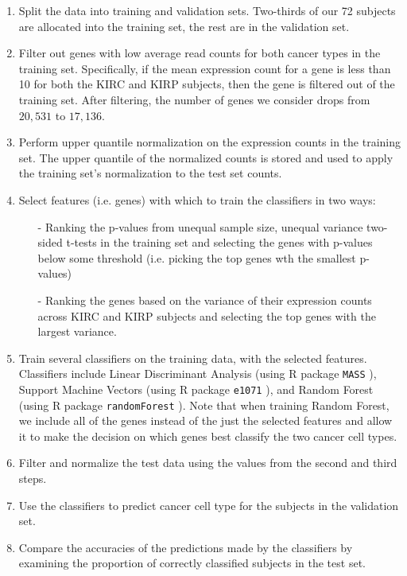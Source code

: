 \begin{enumerate}
\item Split the data into training and validation sets. Two-thirds of our 72 subjects are allocated into the training set,
the rest are in the validation set.
\item Filter out genes with low average read counts for both cancer types in the training set. Specifically, if the 
mean expression count for a gene is less than 10 for both the KIRC and KIRP subjects, then the gene is filtered out of the training
set. After filtering, the number of genes we consider drops from $20,531$ to $17,136$.
\item Perform upper quantile normalization on the expression counts in the training set. The upper quantile of the normalized counts is stored and used to apply the training set's normalization to the test set counts.
\item Select features (i.e. genes) with which to train the classifiers in two ways:
\begin{itemize}
\item[-] Ranking the p-values from unequal sample size, unequal variance two-sided t-tests in the training set and selecting the genes with p-values below some threshold (i.e. picking the top  genes wth the smallest p-values)
\item[-] Ranking the genes based on the variance of their expression counts across KIRC and KIRP subjects and selecting the
top genes with the largest variance.
\end{itemize}

\item Train several classifiers on the training data, with the selected
features. Classifiers include Linear Discriminant Analysis (using R package
\texttt{MASS} \cite{rclassmass}), Support Machine Vectors (using R package
\texttt{e1071} \cite{e1071}), and Random Forest (using R package
\texttt{randomForest} \cite{randforest}).  Note that when training Random
Forest, we include all of the genes instead of the just the selected features
and allow it to make the decision on which genes best classify the two cancer
cell types.

\item Filter and normalize the test data using the values from the second and third steps. 
\item Use the classifiers to predict cancer cell type for the subjects in the validation set.
\item Compare the accuracies of the predictions made by the classifiers by examining the proportion of correctly classified
subjects in the test set.
\end{enumerate}


